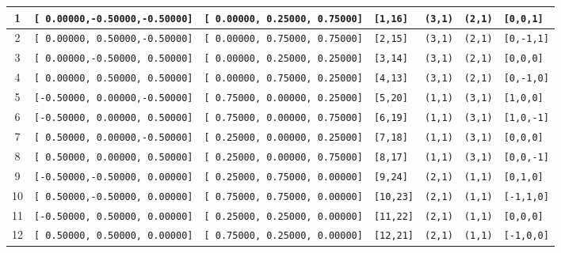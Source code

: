 \documentclass[fleqn,10pt,landscape]{jsarticle}
\begin{document}
\begin{longtable}[l]{cllllll}
1 & \texttt{[ 0.00000,-0.50000,-0.50000]} & \texttt{[ 0.00000, 0.25000, 0.75000]} & \texttt{[1,16]} & \texttt{(3,1)} & \texttt{(2,1)} & \texttt{[0,0,1]} \\ \hline
2 & \texttt{[ 0.00000, 0.50000,-0.50000]} & \texttt{[ 0.00000, 0.75000, 0.75000]} & \texttt{[2,15]} & \texttt{(3,1)} & \texttt{(2,1)} & \texttt{[0,-1,1]} \\ \hline
3 & \texttt{[ 0.00000,-0.50000, 0.50000]} & \texttt{[ 0.00000, 0.25000, 0.25000]} & \texttt{[3,14]} & \texttt{(3,1)} & \texttt{(2,1)} & \texttt{[0,0,0]} \\ \hline
4 & \texttt{[ 0.00000, 0.50000, 0.50000]} & \texttt{[ 0.00000, 0.75000, 0.25000]} & \texttt{[4,13]} & \texttt{(3,1)} & \texttt{(2,1)} & \texttt{[0,-1,0]} \\ \hline
5 & \texttt{[-0.50000, 0.00000,-0.50000]} & \texttt{[ 0.75000, 0.00000, 0.25000]} & \texttt{[5,20]} & \texttt{(1,1)} & \texttt{(3,1)} & \texttt{[1,0,0]} \\ \hline
6 & \texttt{[-0.50000, 0.00000, 0.50000]} & \texttt{[ 0.75000, 0.00000, 0.75000]} & \texttt{[6,19]} & \texttt{(1,1)} & \texttt{(3,1)} & \texttt{[1,0,-1]} \\ \hline
7 & \texttt{[ 0.50000, 0.00000,-0.50000]} & \texttt{[ 0.25000, 0.00000, 0.25000]} & \texttt{[7,18]} & \texttt{(1,1)} & \texttt{(3,1)} & \texttt{[0,0,0]} \\ \hline
8 & \texttt{[ 0.50000, 0.00000, 0.50000]} & \texttt{[ 0.25000, 0.00000, 0.75000]} & \texttt{[8,17]} & \texttt{(1,1)} & \texttt{(3,1)} & \texttt{[0,0,-1]} \\ \hline
9 & \texttt{[-0.50000,-0.50000, 0.00000]} & \texttt{[ 0.25000, 0.75000, 0.00000]} & \texttt{[9,24]} & \texttt{(2,1)} & \texttt{(1,1)} & \texttt{[0,1,0]} \\ \hline
10 & \texttt{[ 0.50000,-0.50000, 0.00000]} & \texttt{[ 0.75000, 0.75000, 0.00000]} & \texttt{[10,23]} & \texttt{(2,1)} & \texttt{(1,1)} & \texttt{[-1,1,0]} \\ \hline
11 & \texttt{[-0.50000, 0.50000, 0.00000]} & \texttt{[ 0.25000, 0.25000, 0.00000]} & \texttt{[11,22]} & \texttt{(2,1)} & \texttt{(1,1)} & \texttt{[0,0,0]} \\ \hline
12 & \texttt{[ 0.50000, 0.50000, 0.00000]} & \texttt{[ 0.75000, 0.25000, 0.00000]} & \texttt{[12,21]} & \texttt{(2,1)} & \texttt{(1,1)} & \texttt{[-1,0,0]} \\
\end{longtable}
\renewcommand{\arraystretch}{1.6}
\end{document}
